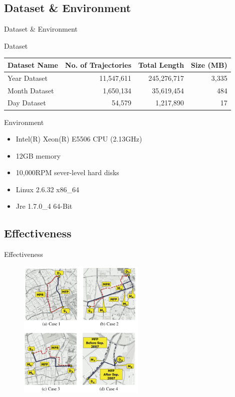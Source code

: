 \documentclass[mathserif]{beamer}
\begin{document}
\subsection[D\&{}E]{Dataset \&{} Environment}
\begin{frame}{Dataset \&{} Environment}
\begin{block}{Dataset}
\begin{small}
\begin{tabular}{|l|r|r|r|}
\hline
Dataset Name & No. of Trajectories & Total Length & Size (MB)\\
\hline
Year Dataset & 11,547,611 & 245,276,717 & 3,335\\
\hline
Month Dataset & 1,650,134 & 35,619,454 & 484\\
\hline
Day Dataset & 54,579 & 1,217,890 & 17\\
\hline
\end{tabular}
\end{small}
\end{block}


\begin{block}{Environment}
\begin{small}
\begin{itemize}
\item Intel(R) Xeon(R) E5506 CPU (2.13GHz)
\item 12GB memory
\item 10,000RPM sever-level hard disks
\item Linux 2.6.32 x86\_64
\item Jre 1.7.0\_4 64-Bit
\end{itemize}
\end{small}
\end{block}
\end{frame}


\subsection{Effectiveness}
\begin{frame}{Effectiveness}
\begin{figure}
\includegraphics[width = 6cm]{exp1.png}
\end{figure}
\end{frame}
\end{document}

